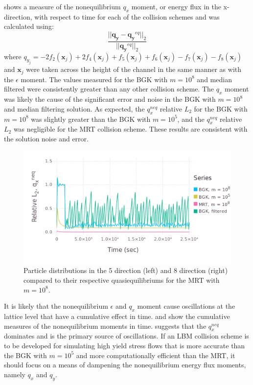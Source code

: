 \documentclass{article}
\newcommand{\pos}{\mathbf{x}}
\begin{document}
 shows a measure of the nonequilibrium $q_x$ moment, or energy flux in the x-direction, with respect to time for each of the collision schemes and was calculated using:
\begin{equation}
    \frac{||\mathbf{q_y} - \mathbf{q_y}^{eq}||_2}{||\mathbf{q_y}^{eq}||_2}
\end{equation}
\noindent where $q_{y_j} = - 2f_2(\pos_j) + 2f_4(\pos_j) + f_5(\pos_j) + f_6(\pos_j) - f_7(\pos_j) - f_8(\pos_j)$ and $\pos_j$ were taken across the height of the channel in the same manner as with the $\epsilon$ moment.
The values measured for the BGK with $m = 10^8$ and median filtered were consistently greater than any other collision scheme.
The $q_x$ moment was likely the cause of the significant error and noise in the BGK with $m = 10^8$ and median filtering solution.
As expected, the $q_x^{neq}$ relative $L_2$ for the BGK with $m = 10^8$ was slightly greater than the BGK with $m = 10^5$, and the $q_x^{neq}$ relative $L_2$ was negligible for the MRT collision scheme.
These results are consistent with the solution noise and error.

\begin{figure}
    \includegraphics[width=\linewidth]{figs/poise-bingham/qx}
    \caption{Particle distributions in the 5 direction (left) and 8 direction (right) compared to their respective quasiequilibriums for the MRT with $m = 10^8$.}
    \label{fig:qx}
\end{figure}

It is likely that the nonequilibrium $\epsilon$ and $q_x$ moment cause oscillations at the lattice level that have a cumulative effect in time.
 and  show the cumulative measures of the nonequilibrium moments in time.
 suggests that the $q_x^{neq}$ dominates and is the primary source of oscillations.
If an LBM collision scheme is to be developed for simulating high yield stress flows that is more accurate than the BGK with $m = 10^5$ and more computationally efficient than the MRT, it should focus on a means of dampening the nonequilibrium energy flux moments, namely $q_x$ and $q_y$.
\end{document}
